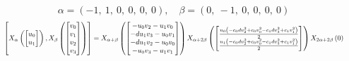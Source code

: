 \documentclass[11pt]{article}
\theoremstyle{definition}
\begin{document}
\[
\alpha = \left( -1, \  1, \  0, \  0, \  0, \  0\right), \quad \beta = \left( 0, \  -1, \  0, \  0, \  0, \  0\right)
\]
\[
\scaletoalign{\textwidth}{\left[ X_{\alpha}\left(\left[\begin{matrix}u_{0}\\u_{1}\end{matrix}\right]\right), X_{\beta}\left(\left[\begin{matrix}v_{0}\\v_{1}\\v_{2}\\v_{3}\end{matrix}\right]\right) \right] = X_{\alpha + \beta}\left(\left[\begin{matrix}- u_{0} v_{2} - u_{1} v_{0}\\- d u_{1} v_{3} - u_{0} v_{1}\\- d u_{1} v_{2} - u_{0} v_{0}\\- u_{0} v_{3} - u_{1} v_{1}\end{matrix}\right]\right) X_{\alpha + 2\beta}\left(\left[\begin{matrix}\frac{u_{0} \left(- c_{0} d v_{2}^{2} + c_{0} v_{0}^{2} - c_{1} d v_{3}^{2} + c_{1} v_{1}^{2}\right)}{2}\\\frac{u_{1} \left(- c_{0} d v_{2}^{2} + c_{0} v_{0}^{2} - c_{1} d v_{3}^{2} + c_{1} v_{1}^{2}\right)}{2}\end{matrix}\right]\right) X_{2\alpha + 2\beta}\left(0\right)}
\]
\end{document}
